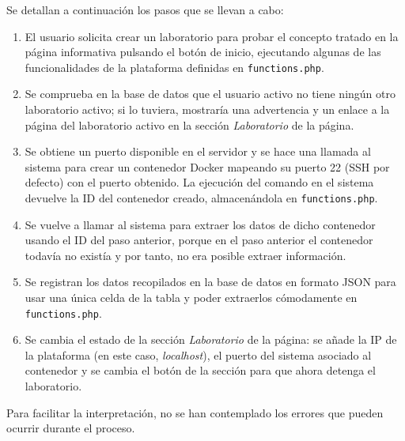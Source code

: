             Se detallan a continuación los pasos que se llevan a cabo:

            \begin{enumerate}
                \item El usuario solicita crear un laboratorio para probar el concepto tratado en la página informativa pulsando el botón de inicio, ejecutando algunas de las funcionalidades de la plataforma definidas en \texttt{functions.php}.

                \item Se comprueba en la base de datos que el usuario activo no tiene ningún otro laboratorio activo; si lo tuviera, mostraría una advertencia y un enlace a la página del laboratorio activo en la sección \textit{Laboratorio} de la página.

                \item Se obtiene un puerto disponible en el servidor y se hace una llamada al sistema para crear un contenedor Docker mapeando su puerto 22 (SSH por defecto) con el puerto obtenido. La ejecución del comando en el sistema devuelve la ID del contenedor creado, almacenándola en \texttt{functions.php}.

                \item Se vuelve a llamar al sistema para extraer los datos de dicho contenedor usando el ID del paso anterior, porque en el paso anterior el contenedor todavía no existía y por tanto, no era posible extraer información.
                
                \item Se registran los datos recopilados en la base de datos en formato JSON para usar una única celda de la tabla y poder extraerlos cómodamente en \texttt{functions.php}.

                \item Se cambia el estado de la sección \textit{Laboratorio} de la página: se añade la IP de la plataforma (en este caso, \textit{localhost}), el puerto del sistema asociado al contenedor y se cambia el botón de la sección para que ahora detenga el laboratorio.
            \end{enumerate}

            Para facilitar la interpretación, no se han contemplado los errores que pueden ocurrir durante el proceso.
            
            \newpage

